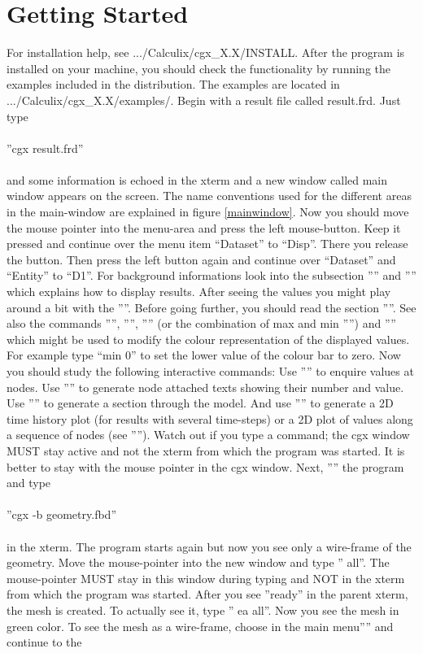 \documentclass{article}
\begin{document}
\section{\label{Getting Started}Getting Started}
For installation help, see .../Calculix/cgx\_X.X/INSTALL. After the program is installed on your machine, you should check the functionality by running the examples included in the distribution. The examples are located in .../Calculix/cgx\_X.X/examples/. Begin with a result file called result.frd. Just type\\\\  ''cgx result.frd''\\\\and some information is echoed in the xterm and a new window called main window appears on the screen. The name conventions used for the different areas in the main-window are explained in figure \ref{mainwindow}. Now you should move the mouse pointer into the menu-area and press the left mouse-button. Keep it pressed and continue over the menu item ``Dataset'' to ``Disp''. There you release the button. Then press the left button again and continue over ``Dataset'' and ``Entity'' to ``D1''. For background informations look into the subsection '''' and '''' which explains how to display results. After seeing the values you might play around a bit with the ''''. Before going further, you should read the section ''''. See also the commands '''', '''', '''' (or the combination of max and min '''') and '''' which might be used to modify the colour representation of the displayed values. For example type ``min 0'' to set the lower value of the colour bar to zero. Now you should study the following interactive commands: Use '''' to enquire values at nodes. Use '''' to generate node attached texts showing their number and value. Use '''' to generate a section through the model. And use '''' to generate a 2D time history plot (for results with several time-steps) or a 2D plot of values along a sequence of nodes (see ''''). Watch out if you type a command; the cgx window MUST stay active and not the xterm from which the program was started. It is better to stay with the mouse pointer in the cgx window. Next, '''' the program and type\\\\  ''cgx -b geometry.fbd''\\\\in the xterm. The program starts again but now you see only a wire-frame of the geometry. Move the mouse-pointer into the new window and type '' all''. The mouse-pointer MUST stay in this window during typing and NOT in the xterm from which the program was started. After you see ''ready'' in the parent xterm, the mesh is created. To actually see it, type '' ea all''. Now you see the mesh in green color. To see the mesh as a wire-frame, choose in the main menu'''' and continue to the 
\end{document}
